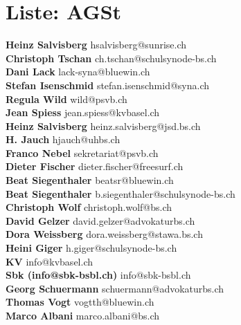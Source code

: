 \documentclass{scrartcl}
\begin{document}
\section*{Liste: AGSt}
\textbf{Heinz Salvisberg } hsalvisberg@sunrise.ch\\
\textbf{Christoph Tschan } ch.tschan@schulsynode-bs.ch\\
\textbf{Dani Lack } lack-syna@bluewin.ch\\
\textbf{Stefan Isenschmid } stefan.isenschmid@syna.ch\\
\textbf{Regula Wild } wild@psvb.ch\\
\textbf{Jean Spiess } jean.spiess@kvbasel.ch\\
\textbf{Heinz Salvisberg } heinz.salvisberg@jsd.bs.ch\\
\textbf{H. Jauch } hjauch@uhbs.ch\\
\textbf{Franco Nebel } sekretariat@psvb.ch\\
\textbf{Dieter Fischer } dieter.fischer@freesurf.ch\\
\textbf{Beat Siegenthaler } beatsr@bluewin.ch\\
\textbf{Beat Siegenthaler } b.siegenthaler@schulsynode-bs.ch\\
\textbf{Christoph Wolf } christoph.wolf@bs.ch\\
\textbf{David Gelzer } david.gelzer@advokaturbs.ch\\
\textbf{Dora Weissberg } dora.weissberg@stawa.bs.ch\\
\textbf{Heini Giger } h.giger@schulsynode-bs.ch\\
\textbf{KV } info@kvbasel.ch\\
\textbf{Sbk (info@sbk-bsbl.ch) } info@sbk-bsbl.ch\\
\textbf{Georg Schuermann } schuermann@advokaturbs.ch\\
\textbf{Thomas Vogt } vogtth@bluewin.ch\\
\textbf{Marco Albani } marco.albani@bs.ch\\
\end{document}
